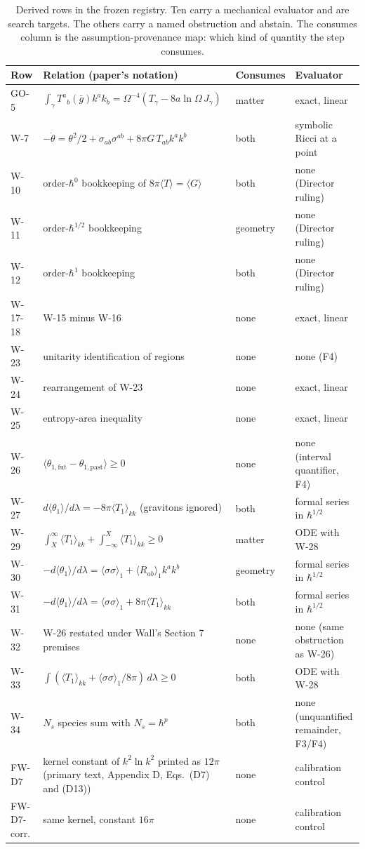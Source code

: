 \documentclass[11pt]{article}
\begin{document}
\begin{table}[t]
\centering
\caption{Derived rows in the frozen registry. Ten carry a mechanical evaluator and are search targets. The others carry a named obstruction and abstain. The consumes column is the assumption-provenance map: which kind of quantity the step consumes.}
\label{tab:registry}
\small
\begin{tabular}{llll}
\toprule
Row & Relation (paper's notation) & Consumes & Evaluator \\
\midrule
GO-5 & $\int_\gamma T^a{}_b(\bar g)k^ak_b = \Omega^{-4}(T_\gamma - 8a\ln\Omega\, J_\gamma)$ & matter & exact, linear \\
W-7 & $-\dot\theta = \theta^2/2 + \sigma_{ab}\sigma^{ab} + 8\pi G\,T_{ab}k^ak^b$ & both & symbolic Ricci at a point \\
W-10 & order-$\hbar^0$ bookkeeping of $8\pi\langle T\rangle = \langle G\rangle$ & both & none (Director ruling) \\
W-11 & order-$\hbar^{1/2}$ bookkeeping & geometry & none (Director ruling) \\
W-12 & order-$\hbar^1$ bookkeeping & both & none (Director ruling) \\
W-17-18 & W-15 minus W-16 & none & exact, linear \\
W-23 & unitarity identification of regions & none & none (F4) \\
W-24 & rearrangement of W-23 & none & exact, linear \\
W-25 & entropy-area inequality & none & exact, linear \\
W-26 & $\langle\theta_{1,\mathrm{fut}}-\theta_{1,\mathrm{past}}\rangle \ge 0$ & none & none (interval quantifier, F4) \\
W-27 & $d\langle\theta_1\rangle/d\lambda = -8\pi\langle T_1\rangle_{kk}$ (gravitons ignored) & both & formal series in $\hbar^{1/2}$ \\
W-29 & $\int_X^\infty\langle T_1\rangle_{kk} + \int_{-\infty}^X\langle T_1\rangle_{kk} \ge 0$ & matter & ODE with W-28 \\
W-30 & $-d\langle\theta_1\rangle/d\lambda = \langle\sigma\sigma\rangle_1 + \langle R_{ab}\rangle_1 k^ak^b$ & geometry & formal series in $\hbar^{1/2}$ \\
W-31 & $-d\langle\theta_1\rangle/d\lambda = \langle\sigma\sigma\rangle_1 + 8\pi\langle T_1\rangle_{kk}$ & both & formal series in $\hbar^{1/2}$ \\
W-32 & W-26 restated under Wall's Section 7 premises & none & none (same obstruction as W-26) \\
W-33 & $\int(\langle T_1\rangle_{kk} + \langle\sigma\sigma\rangle_1/8\pi)\,d\lambda \ge 0$ & both & ODE with W-28 \\
W-34 & $N_s$ species sum with $N_s = \hbar^p$ & both & none (unquantified remainder, F3/F4) \\
\midrule
FW-D7 & kernel constant of $k^2\ln k^2$ printed as $12\pi$ (primary text, Appendix D, Eqs.\ (D7) and (D13)) & none & calibration control \\
FW-D7-corr. & same kernel, constant $16\pi$ & none & calibration control \\
\bottomrule
\end{tabular}
\end{table}
\end{document}
